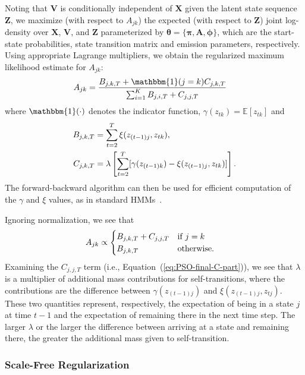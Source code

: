 \documentclass[letterpaper]{article}
\begin{document}
Noting that $\mathbf{V}$ is conditionally independent of $\mathbf{X}$ given the
latent state sequence $\mathbf{Z}$, we maximize (with respect to $A_{jk}$) the expected 
(with respect to $\mathbf{Z}$) joint log-density over $\mathbf{X}$, $\mathbf{V}$, and $\mathbf{Z}$ parameterized by
$\mathbf{\theta} = \{\mathbf{\pi},\mathbf{A}, \mathbf{\phi}\}$, which are the start-state
probabilities, state transition matrix and emission parameters, respectively. Using appropriate Lagrange multipliers, we obtain the regularized
maximum likelihood estimate for $A_{jk}$:
\begin{align}\label{eq:PSO-final}
    A_{jk} &= \frac{B_{j,k,T} + {\mathbbm{1}(j = k)}C_{j,k,T}} 
                   {\sum_{i=1}^{K} B_{j,i,T} + C_{j,j,T}}
\end{align}
where $\mathbbm{1}(\cdot)$ denotes the indicator function, $\gamma(z_{tk}) = \mathbb{E}[z_{tk}]$ and
\begin{align}\label{eq:PSO-final-C-part}
    B_{j,k,T} &= \sum_{t=2}^{T} \xi(z_{(t-1)j}, z_{tk}), \notag\\
    C_{j,k,T} &= \lambda\left[\sum_{t=2}^{T}[\gamma(z_{(t-1)k}) - \xi(z_{(t-1)j}, z_{tk})]\right].
\end{align}
The forward-backward algorithm can then be used for efficient computation of the $\gamma$ and $\xi$ values, as in standard HMMs~\cite{bishop2007pattern}.

Ignoring normalization, we see that
\begin{align*}
  \setlength{\abovedisplayskip}{0pt}
  \setlength{\belowdisplayskip}{0pt}
    A_{jk} &\propto \begin{cases} 
                B_{j,k,T} + C_{j,j,T} & \mbox{if } j=k \\ 
                B_{j,k,T} & \mbox{otherwise.}
              \end{cases}
\end{align*}
Examining the $C_{j,j,T}$ term (i.e., Equation~(\ref{eq:PSO-final-C-part})), we see that $\lambda$ is a multiplier of
additional mass contributions for self-transitions, where the contributions are
the difference between $\gamma(z_{(t-1)j})$ and $\xi(z_{(t-1)j}, z_{tj})$. These
two quantities represent, respectively, the expectation of being in a state $j$
at time $t-1$ and the expectation of remaining there in the next time step. The
larger $\lambda$ or the larger the difference between arriving at a state and
remaining there, the greater the additional mass given to self-transition.

\subsubsection{Scale-Free Regularization}
\end{document}
